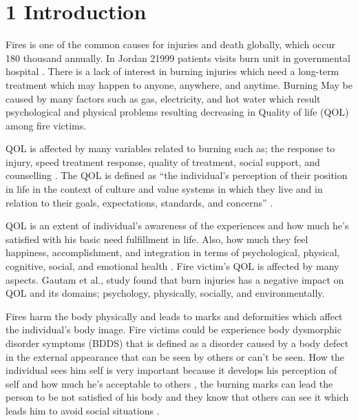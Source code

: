 \documentclass[10pt]{NSP1}
\begin{document}



\maketitle



\section{1 Introduction}

Fires is one of the common causes for injuries and death globally, which occur 180 thousand annually. In Jordan 21999 patients visits burn unit in governmental hospital . There is a lack of interest in burning injuries which need a long-term treatment which may happen to anyone, anywhere, and anytime. Burning May be caused by many factors such as gas, electricity, and hot water which result psychological and physical problems resulting decreasing in Quality of life (QOL) among fire victims.

QOL is affected by many variables related to burning such as; the response to injury, speed treatment response, quality of treatment, social support, and counselling . The QOL is defined as “the individual’s perception of their position in life in the context of culture and value systems in which they live and in relation to their goals, expectations, standards, and concerns” .

QOL is an extent of individual’s awareness of the experiences and how much he’s satisfied with his basic need fulfillment in life. Also, how much they feel happiness, accomplishment, and integration in terms of psychological, physical, cognitive, social, and emotional health . Fire victim’s QOL is affected by many aspects. Gautam et al.,  study found that burn injuries has a negative impact on QOL and its domains; psychology, physically, socially, and environmentally.

Fires harm the body physically and leads to marks and deformities which affect the individual’s body image. Fire victims could be experience body dysmorphic disorder symptoms (BDDS) that is defined as a disorder caused by a body defect in the external appearance that can be seen by others or can’t be seen. How the individual sees him self is very important because it develops his perception of self and how much he’s acceptable to others , the burning marks can lead the person to be not satisfied of his body and they know that others can see it which leads him to avoid social situations .
\end{document}

